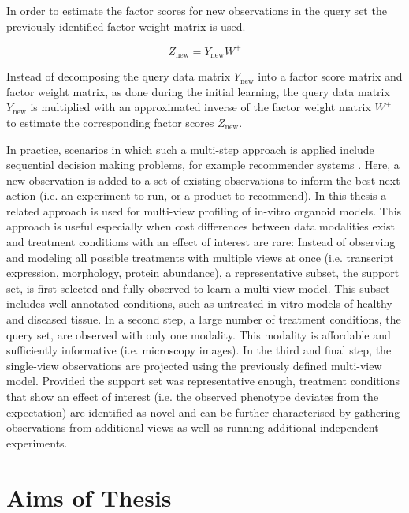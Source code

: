 \begin{flushleft}
In order to estimate the factor scores for new observations in the query set the previously identified factor weight matrix is used. 

\begin{equation}
    Z_{\text{new}} = Y_{\text{new}} W^+
\end{equation}

Instead of decomposing the query data matrix \(Y_{\text{new}}\) into a factor score matrix and factor weight matrix, as done during the initial learning, the query data matrix  \(Y_{\text{new}}\) is multiplied with an approximated inverse of the factor weight matrix \( W^+ \) to estimate the corresponding factor scores \( Z_{\text{new}} \).
\par

In practice, scenarios in which such a multi-step approach is applied include sequential decision making problems, for example recommender systems \citep{korenMatrixFactorizationTechniques2009}. Here, a new observation is added to a set of existing observations to inform the best next action (i.e. an experiment to run, or a product to recommend). In this thesis a related approach is used for multi-view profiling of in-vitro organoid models. This approach is useful especially when cost differences between data modalities exist and treatment conditions with an effect of interest are rare: Instead of observing and modeling all possible treatments with multiple views at once (i.e. transcript expression, morphology, protein abundance), a representative subset, the support set, is first selected and fully observed to learn a multi-view model. This subset includes well annotated conditions, such as untreated in-vitro models of healthy and diseased tissue. In a second step, a large number of treatment conditions, the query set, are observed with only one modality. This modality is affordable and sufficiently informative (i.e. microscopy images). In the third and final step, the single-view observations are projected using the previously defined multi-view model. Provided the support set was representative enough, treatment conditions that show an effect of interest (i.e. the observed phenotype deviates from the expectation) are identified as novel and can be further characterised by gathering observations from additional views as well as running additional independent experiments.

\newpage
\section{Aims of Thesis}


\end{flushleft}
